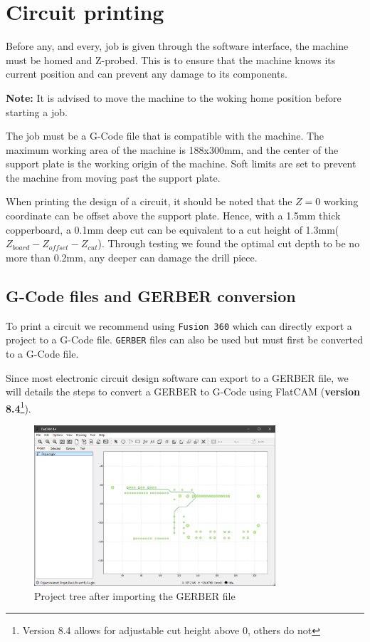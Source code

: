\documentclass[11pt, openright]{book}
\begin{document}
 \section{Circuit printing}

    Before any, and every, job is given through the software interface, the machine must be homed and Z-probed. This is to ensure that the machine knows its current position and can prevent any damage to its components.

     \begin{dent}{\textbf{Note:}}
        It is advised to move the machine to the woking home position before starting a job. 
    \end{dent}

    The job must be a G-Code file that is compatible with the machine. The maximum working area of the machine is 188x300mm, and the center of the support plate is the working origin of the machine. Soft limits are set to prevent the machine from moving past the support plate.

    When printing the design of a circuit, it should be noted that the $Z=0$ working coordinate can be offset above the support plate. Hence, with a 1.5mm thick copperboard, a 0.1mm deep cut can be equivalent to a cut height of 1.3mm($Z_{board}- Z_{offset} - Z_{cut}$). Through testing we found the optimal cut depth to be no more than 0.2mm, any deeper can damage the drill piece. 

     \subsection{G-Code files and GERBER conversion}

    To print a circuit we recommend using \texttt{Fusion 360} which can directly export a project to a G-Code file. \texttt{GERBER} files can also be used but must first be converted to a G-Code file.

    Since most electronic circuit design software can export to a GERBER file, we will details the steps to convert a GERBER to G-Code using FlatCAM (\textbf{version 8.4}\footnote[1]{Version 8.4 allows for adjustable cut height above 0, others do not}).

   
    
     \begin{figure}[ht!]
        \centering
        \includegraphics[width=0.8\textwidth]{./includes/G1.png}
        \caption{Project tree after importing the GERBER file}
    \end{figure}
    
\end{document}
